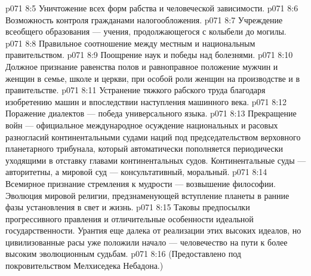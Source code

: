 \vs p071 8:5 \pc {}\bibnobreakspace Уничтожение всех форм рабства и человеческой зависимости.
\vs p071 8:6 \pc {}\bibnobreakspace Возможность контроля гражданами налогообложения.
\vs p071 8:7 \pc {}\bibnobreakspace Учреждение всеобщего образования --- учения, продолжающегося с колыбели до могилы.
\vs p071 8:8 \pc {}\bibnobreakspace Правильное соотношение между местным и национальным правительством.
\vs p071 8:9 \pc {}\bibnobreakspace Поощрение наук и победы над болезнями.
\vs p071 8:10 \pc {}\bibnobreakspace Должное признание равенства полов и равноправное положение мужчин и женщин в семье, школе и церкви, при особой роли женщин на производстве и в правительстве.
\vs p071 8:11 \pc {}\bibnobreakspace Устранение тяжкого рабского труда благодаря изобретению машин и впоследствии наступления машинного века.
\vs p071 8:12 \pc {}\bibnobreakspace Поражение диалектов --- победа универсального языка.
\vs p071 8:13 \pc {}\bibnobreakspace Прекращение войн --- официальное международное осуждение национальных и расовых разногласий континентальными судами наций под председательством верховного планетарного трибунала, который автоматически пополняется периодически уходящими в отставку главами континентальных судов. Континентальные суды --- авторитетны, а мировой суд --- консультативный, моральный.
\vs p071 8:14 \pc {}\bibnobreakspace Всемирное признание стремления к мудрости --- возвышение философии. Эволюция мировой религии, предзнаменующей вступление планеты в ранние фазы установления в свет и жизнь.
\vs p071 8:15 \pc Таковы предпосылки прогрессивного правления и отличительные особенности идеальной государственности. Урантия еще далека от реализации этих высоких идеалов, но цивилизованные расы уже положили начало --- человечество на пути к более высоким эволюционным судьбам.
\vsetoff
\vs p071 8:16 (Предоставлено под покровительством Мелхиседека Небадона.)
